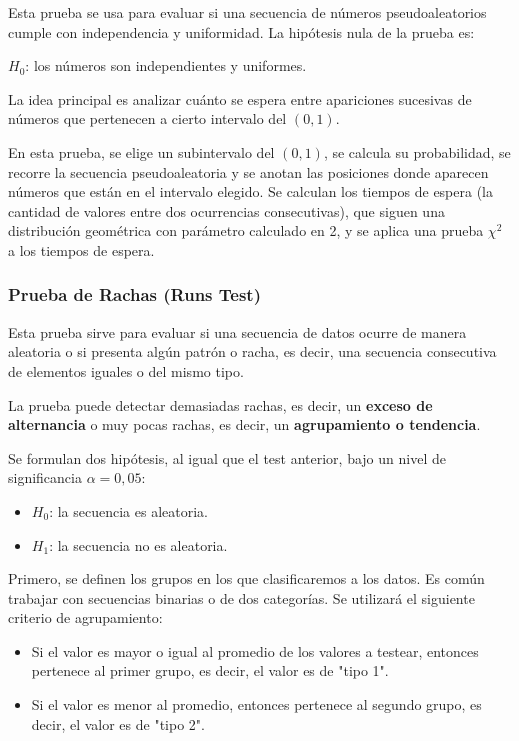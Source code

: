 \documentclass{article}
\begin{document}
Esta prueba se usa para evaluar si una secuencia de números pseudoaleatorios cumple con independencia y uniformidad. La hipótesis nula de la prueba es:

$H_0$: los números son independientes y uniformes.

La idea principal es analizar cuánto se espera entre apariciones sucesivas de números que pertenecen a cierto intervalo del $(0,1)$.

En esta prueba, se elige un subintervalo del $(0,1)$, se calcula su probabilidad, se recorre la secuencia pseudoaleatoria y se anotan las posiciones donde aparecen números que están en el intervalo elegido. Se calculan los tiempos de espera (la cantidad de valores entre dos ocurrencias consecutivas), que siguen una distribución geométrica con parámetro calculado en 2, y se aplica una prueba $\chi^2$ a los tiempos de espera.

\subsubsection{Prueba de Rachas (Runs Test)}

Esta prueba sirve para evaluar si una secuencia de datos ocurre de manera aleatoria o si presenta algún patrón o racha, es decir, una secuencia consecutiva de elementos iguales o del mismo tipo.

La prueba puede detectar demasiadas rachas, es decir, un \textbf{exceso de alternancia} o muy pocas rachas, es decir, un \textbf{agrupamiento o tendencia}.

Se formulan dos hipótesis, al igual que el test anterior, bajo un nivel de significancia $\alpha = 0,05$:

\begin{itemize}
  \item $H_0$: la secuencia es aleatoria.
  \item $H_1$: la secuencia no es aleatoria.
\end{itemize}

Primero, se definen los grupos en los que clasificaremos a los datos. Es común trabajar con secuencias binarias o de dos categorías. Se utilizará el siguiente criterio de agrupamiento:

\begin{itemize}
  \item Si el valor es mayor o igual al promedio de los valores a testear, entonces pertenece al primer grupo, es decir, el valor es de "tipo 1".
  \item Si el valor es menor al promedio, entonces pertenece al segundo grupo, es decir, el valor es de "tipo 2".
\end{itemize}
\end{document}
